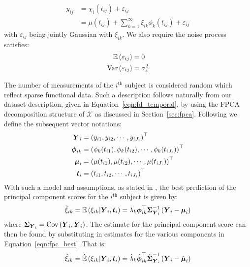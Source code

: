 \begin{align}
	y_{ij} &= \chi_{i}(t_{ij}) + \varepsilon_{ij} \\
	&= \mu(t_{ij}) + \sum_{k=1}^{\infty} \xi_{ik} \phi_k(t_{ij}) + \varepsilon_{ij} \label{eqn:fd_temporal_fpca}
\end{align}
with $\varepsilon_{ij}$ being jointly Gaussian with $\xi_{ik}$.
We also require the noise process satisfies:
\begin{align}
	\operatorname{\mathbb{E}}\left(\varepsilon_{ij}\right) &= 0 \\
	\text{Var}\left( \varepsilon_{ij} \right) &= \sigma_\varepsilon^2
\end{align}

The number of measurements of the $i^\text{th}$ subject is considered random which reflect sparse functional data.
Such a description follows naturally from our dataset description, given in Equation~\eqref{eqn:fd_temporal}, by using the FPCA decomposition structure of $\mathcal{X}$ as discussed in Section~\ref{sec:fpca}.
Following \citep{yao_functional_2005} we define the subsequent vector notations:
\begin{align}
	\bm{{Y}}_{i} &= \left(y_{i1}, y_{i2}, \cdots, y_{iJ_i}\right)^\top \label{eqn:yvec}\\
	\bm{{\phi}}_{ik} &= \left(\phi_{k}(t_{i1}), \phi_{k}(t_{i2}), \cdots, \phi_k(t_{iJ_i}) \right)^\top \label{eqn:phivec} \\
	\bm{{\mu}}_{i} &= \left(\mu(t_{i1}), \mu(t_{i2}), \cdots, \mu(t_{iJ_i})\right)^\top \label{eqn:muvec}\\
	\bm{{t}}_{i} &= \left( t_{i1}, t_{i2}, \cdots, t_{iJ_i} \right)^\top \label{eqn:tvec}
\end{align}
With such a model and assumptions, as stated in \citep{yao_functional_2005}, the best prediction of the principal component scores for the $i^\text{th}$  subject is given by:
\begin{equation}\label{eqn:fpc_best}
	\tilde{\xi}_{ik} = \operatorname{\mathbb{E}}\left(\xi_{ik} | \bm{{Y}}_{i}, \bm{{t}}_{i} \right) = \lambda_k \bm{{\phi}}_{ik}^{\top} \bm{{\Sigma}}_{\bm{{Y}}_{i}}^{-1} \left( \bm{{Y}}_{i} - \bm{{\mu}}_{i} \right)
\end{equation}
where $\bm{{\Sigma}}_{\bm{{Y}}_{i}} = \text{Cov}\left(\bm{{Y}}_{i}, \bm{{Y}}_{i} \right)$.
The estimate for the principal component score can then be found by substituting in estimates for the various components in Equation~\eqref{eqn:fpc_best}.
That is:
\begin{equation}\label{eqn:fpc_est}
	\hat{\xi}_{ik}= \hat{\operatorname{\mathbb{E}}}\left(\xi_{ik} | \bm{{Y}}_{i}, \bm{{t}}_{i} \right) = \hat\lambda_k \hat{\bm{{\phi}}}_{ik}^{\top} \hat{\bm{{\Sigma}}}_{\bm{{Y}}_{i}}^{-1} \left( \bm{{Y}}_{i} - \hat{\bm{{\mu}}}_{i} \right)
\end{equation}
